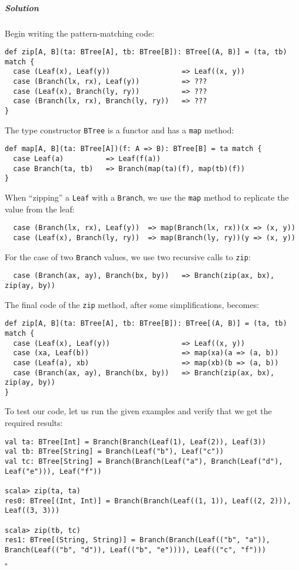 \subparagraph{Solution}

Begin writing the pattern-matching code: 
\begin{lstlisting}
def zip[A, B](ta: BTree[A], tb: BTree[B]): BTree[(A, B)] = (ta, tb) match {
  case (Leaf(x), Leaf(y))                 => Leaf((x, y))
  case (Branch(lx, rx), Leaf(y))          => ???
  case (Leaf(x), Branch(ly, ry))          => ???
  case (Branch(lx, rx), Branch(ly, ry))   => ???
}
\end{lstlisting}
The type constructor \lstinline!BTree! is a functor and has a \lstinline!map!
method:
\begin{lstlisting}
def map[A, B](ta: BTree[A])(f: A => B): BTree[B] = ta match {
  case Leaf(a)          => Leaf(f(a))
  case Branch(ta, tb)   => Branch(map(ta)(f), map(tb)(f))
}
\end{lstlisting}
When \textsf{``}zipping\textsf{''} a \lstinline!Leaf! with a \lstinline!Branch!,
we use the \lstinline!map! method to replicate the value from the
leaf:
\begin{lstlisting}
  case (Branch(lx, rx), Leaf(y))  => map(Branch(lx, rx))(x => (x, y))
  case (Leaf(x), Branch(ly, ry))  => map(Branch(ly, ry))(y => (x, y)) 
\end{lstlisting}
For the case of two \lstinline!Branch! values, we use two recursive
calls to \lstinline!zip!:
\begin{lstlisting}
  case (Branch(ax, ay), Branch(bx, by))   => Branch(zip(ax, bx), zip(ay, by))
\end{lstlisting}
The final code of the \lstinline!zip! method, after some simplifications,
becomes:

\begin{lstlisting}
def zip[A, B](ta: BTree[A], tb: BTree[B]): BTree[(A, B)] = (ta, tb) match {
  case (Leaf(x), Leaf(y))                 => Leaf((x, y))
  case (xa, Leaf(b))                      => map(xa)(a => (a, b))
  case (Leaf(a), xb)                      => map(xb)(b => (a, b))
  case (Branch(ax, ay), Branch(bx, by))   => Branch(zip(ax, bx), zip(ay, by))
}
\end{lstlisting}
To test our code, let us run the given examples and verify that we
get the required results:
\begin{lstlisting}
val ta: BTree[Int] = Branch(Branch(Leaf(1), Leaf(2)), Leaf(3))
val tb: BTree[String] = Branch(Leaf("b"), Leaf("c"))
val tc: BTree[String] = Branch(Branch(Leaf("a"), Branch(Leaf("d"), Leaf("e"))), Leaf("f")) 

scala> zip(ta, ta)
res0: BTree[(Int, Int)] = Branch(Branch(Leaf((1, 1)), Leaf((2, 2))), Leaf((3, 3)))

scala> zip(tb, tc)
res1: BTree[(String, String)] = Branch(Branch(Leaf(("b", "a")), Branch(Leaf(("b", "d")), Leaf(("b", "e")))), Leaf(("c", "f"))) 
\end{lstlisting}
$\square$

